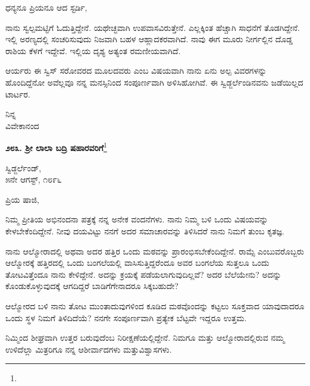\vspace{-0.3cm}

\noindent
ಧನ್ಯನೂ ಪ್ರಿಯನೂ ಆದ ಸ್ಟರ್ಡಿ,

ನಾನು ಸ್ವಲ್ಪಮಟ್ಟಿಗೆ ಓದುತ್ತಿದ್ದೇನೆ. ಯಥೇಚ್ಛವಾಗಿ ಉಪವಾಸವಿರುತ್ತೇನೆ. ಎಲ್ಲಕ್ಕಿಂತ ಹೆಚ್ಚಾಗಿ ಸಾಧನೆಗೆ ತೊಡಗಿದ್ದೇನೆ. ಇಲ್ಲಿ ಅರಣ್ಯದಲ್ಲಿ ಸಂಚರಿಸುವುದು ನಿಜವಾಗಿ ಬಹಳ ಆಹ್ಲಾದಕರವಾಗಿದೆ. ನಾವು ಈಗ ಮೂರು ನೀರ್ಗಲ್ಲಿನ ದೊಡ್ಡ ರಾಶಿಯ ಕೆಳಗೆ ಇದ್ದೇವೆ. ಇಲ್ಲಿಯ ದೃಶ್ಯ ಅತ್ಯಂತ ರಮಣೀಯವಾಗಿದೆ.

ಆರ್ಯರು ಈ ಸ್ವಿಸ್ ಸರೋವರದ ಮೂಲದವರು ಎಂಬ ವಿಷಯವಾಗಿ ನಾನು ಏನು ಅಲ್ಪ ವಿವರಗಳನ್ನು ಹೊಂದಿದ್ದೆನೋ ಅವೆಲ್ಲವೂ ನನ್ನ ಮನಸ್ಸಿನಿಂದ ಸಂಪೂರ್ಣವಾಗಿ ಅಳಿಸಿಹೋಗಿವೆ. ಈ ಸ್ವಿಡ್ಜರ್ಲೆಂಡಿನವನು ಜಡೆಯಿಲ್ಲದ ಟಾರ್ಟರ.

\vspace{-0.5cm}

{\flushright
ನಿನ್ನ\\ವಿವೇಕಾನಂದ\par}

\begin{center}
\textbf{೨೮೩. ಶ‍್ರೀ ಲಾಲಾ ಬದ್ರಿ ಷಹಾರವರಿಗೆ}\footnote{}
\end{center}

\vspace{-0.5cm}

\begin{flushright}
ಸ್ವಿಡ್ಜರ್ಲೆಂಡ್,\\೫ನೇ ಆಗಸ್ಟ್, ೧೮೯೬
\end{flushright}

\vspace{-0.3cm}

\noindent
ಪ್ರಿಯ ಷಾಜಿ,

ನಿಮ್ಮ ಪ್ರೀತಿಯ ಅಭಿನಂದನಾ ಪತ್ರಕ್ಕೆ ನನ್ನ ಅನೇಕ ವಂದನೆಗಳು. ನಾನು ನಿಮ್ಮ ಬಳಿ ಒಂದು ವಿಷಯವನ್ನು ಕೇಳಬೇಕೆಂದಿದ್ದೇನೆ. ನೀವು ದಯವಿಟ್ಟು ನನಗೆ ಅದರ ಸಮಾಚಾರವನ್ನು ತಿಳಿಸಿದರೆ ನಾನು ನಿಮಗೆ ತುಂಬ ಕೃತಜ್ಞ.

ನಾನು ಆಲ್ಮೋರಾದಲ್ಲಿ ಅಥವಾ ಅದರ ಹತ್ತಿರ ಒಂದು ಮಠವನ್ನು ಪ್ರಾರಂಭಿಸಬೇಕೆಂದಿದ್ದೇನೆ. ರಾಮ್ಸೆ ಎಂಬುವರೊಬ್ಬರು ಆಲ್ಮೋರಕ್ಕೆ ಹತ್ತಿರದಲ್ಲಿ ಒಂದು ಬಂಗಲೆಯಲ್ಲಿ ವಾಸಿಸುತ್ತಿದ್ದರೆಂದೂ ಅವರ ಬಂಗಲೆಯ ಸುತ್ತಲೂ ಒಂದು ತೋಟವಿತ್ತೆಂದೂ ನಾನು ಕೇಳಿದ್ದೇನೆ. ಅದನ್ನು ಕ್ರಯಕ್ಕೆ ಪಡೆಯಲಾಗುವುದಿಲ್ಲವೆ? ಅದರ ಬೆಲೆಯೇನು? ಅದನ್ನು ಕೊಂಡುಕೊಳ್ಳುವುದಕ್ಕೆ ಆಗದಿದ್ದರೆ ಬಾಡಿಗೆಗೇನಾದರೂ ಸಿಕ್ಕಬಹುದೇ?

ಆಲ್ಮೋರದ ಬಳಿ ನಾನು ತೋಟ ಮುಂತಾದುವುಗಳಿಂದ ಕೂಡಿದ ಮಠವೊಂದನ್ನು ಕಟ್ಟಲು ಸೂಕ್ತವಾದ ಯಾವುದಾದರೂ ಒಂದು ಸ್ಥಳ ನಿಮಗೆ ತಿಳಿದಿದೆಯೆ? ನನಗೇ ಸಂಪೂರ್ಣವಾಗಿ ಪ್ರತ್ಯೇಕ ಬೆಟ್ಟವೇ ಇದ್ದರೂ ಉತ್ತಮ.

ನಿಮ್ಮಿಂದ ಶೀಘ್ರವಾಗಿ ಉತ್ತರ ಬರುವುದೆಂಬ ನಿರೀಕ್ಷಣೆಯಲ್ಲಿದ್ದೇನೆ. ನಿಮಗೂ ಮತ್ತು ಆಲ್ಮೋರಾದಲ್ಲಿರುವ ನಮ್ಮ ಉಳಿದೆಲ್ಲಾ ಮಿತ್ರರಿಗೂ ನನ್ನ ಆಶೀರ್ವಾದಗಳು ಮತ್ತು\break ವಿಶ್ವಾಸಗಳು.

\vspace{-0.65cm}

